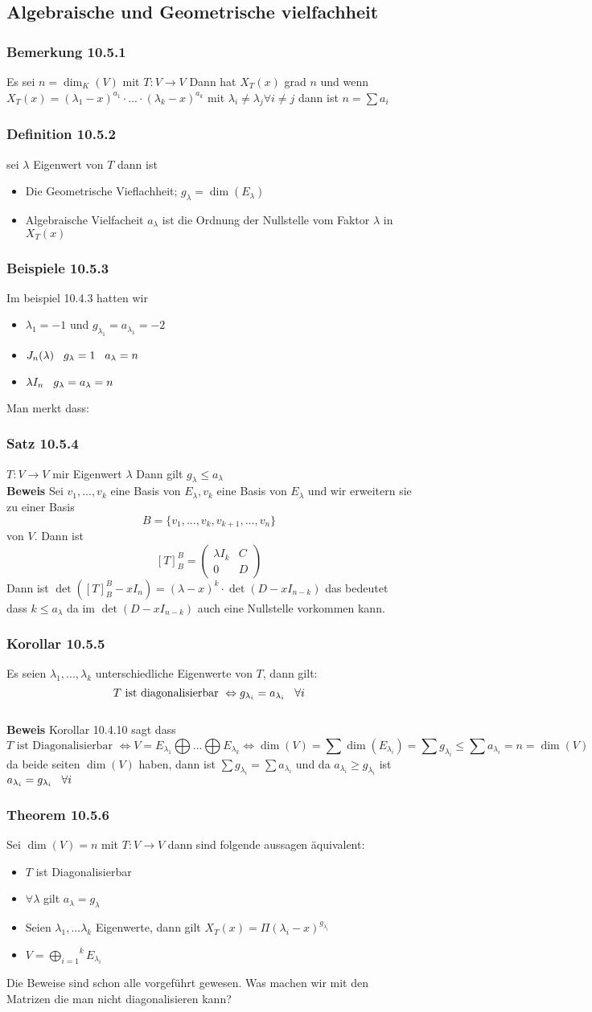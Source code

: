 \documentclass{article}
\newcommand{\smspc}{\hspace{0.3cm}}
\newcommand{\satz}[1]{\subsubsection*{Satz {#1}}}
\newcommand{\korollar}[1]{\subsubsection*{Korollar {#1}}}
\newcommand{\beweis}{\\\textbf{Beweis }}
\newcommand{\beispiel}[1]{\subsubsection*{Beispiele {#1}}}
\newcommand{\bemerkung}[1]{\subsubsection*{Bemerkung {#1}}}
\newcommand{\theorem}[1]{\subsubsection*{Theorem {#1}}}
\newcommand{\definition}[1]{\subsubsection*{Definition {#1}}}
\begin{document}
\subsection*{Algebraische und Geometrische vielfachheit}
\bemerkung{10.5.1} Es sei $n=\dim_K(V)$ mit $T:V\rightarrow V$ Dann hat $X_T(x)$ grad $n$ und wenn $X_T(x)=(\lambda_1-x)^{a_1}\cdot...\cdot (\lambda_k-x)^{a_k}$ mit $\lambda_i\neq\lambda_j\forall i\neq j$ dann ist $n=\sum a_i$
\definition{10.5.2} sei $\lambda$ Eigenwert von $T$ dann ist \begin{itemize}
  \item{Die Geometrische Vieflachheit; $g_\lambda=\dim(E_\lambda)$}
  \item{Algebraische Vielfacheit $a_\lambda$ ist die Ordnung der Nullstelle vom Faktor $\lambda$ in $X_T(x)$}
\end{itemize}
\beispiel{10.5.3} Im beispiel 10.4.3 hatten wir \begin{itemize}\item{$\lambda_1=-1$ und $g_{\lambda_1}=a_{\lambda_1}=-2$}
  \item{$J_n(\lambda)\smspc g_{\lambda}=1\smspc a_\lambda=n$}
  \item{$\lambda I_n \smspc g_\lambda=a_\lambda=n$}
\end{itemize}
Man merkt dass:

\satz{10.5.4} $T:V\rightarrow V$ mir Eigenwert $\lambda$ Dann gilt $g_\lambda\le a_\lambda$
\beweis Sei $v_1,...,v_k$ eine Basis von $E_\lambda,v_k$ eine Basis von $E_\lambda$ und wir erweitern sie zu einer Basis \[B=\lbrace v_1,...,v_k,v_{k+1},...,v_n\rbrace\]
von $V$. Dann ist \[[T]^B_B=\begin{pmatrix}\lambda I_k&C\\0&D\end{pmatrix}\] Dann ist
$\det([T]^B_B-xI_n)=(\lambda-x)^k\cdot\det(D-xI_{n-k})$ das bedeutet dass $k\le a_\lambda$ da im $\det(D-xI_{n-k})$ auch eine Nullstelle vorkommen kann.

\korollar{10.5.5} Es seien $\lambda_1,...,\lambda_k$ unterschiedliche Eigenwerte von $T$, dann gilt: \[T \text{ ist diagonalisierbar }\Leftrightarrow g_{\lambda_i}=a_{\lambda_i}\smspc \forall i\]
\beweis Korollar 10.4.10 sagt dass \[T\text{ ist Diagonalisierbar }\Leftrightarrow V=E_{\lambda_1}\bigoplus...\bigoplus E_{\lambda_k}\Leftrightarrow \dim(V)=\sum\dim(E_{\lambda_i})=\sum g_{\lambda_i}\le\sum a_{\lambda_i}=n=\dim(V)\]
da beide seiten $\dim(V)$ haben, dann ist $\sum g_{\lambda_i}=\sum a_{\lambda_i}$ und da $a_{\lambda_i}\ge g_{\lambda_i}$ ist $a_{\lambda_i}=g_{\lambda_i}\smspc\forall i$
\theorem{10.5.6} Sei $\dim(V)=n$ mit $T:V\rightarrow V$ dann sind folgende aussagen äquivalent:\begin{itemize}
  \item{$T$ ist Diagonalisierbar}
  \item{$\forall\lambda$ gilt $a_\lambda=g_\lambda$}
  \item{Seien $\lambda_1,...\lambda_k$ Eigenwerte, dann gilt $X_T(x)=\Pi(\lambda_i-x)^{g_{\lambda_i}}$}
  \item{$V=\overset{k}{\underset{i=1}{\bigoplus}}E_{\lambda_i}$}
\end{itemize}
Die Beweise sind schon alle vorgeführt gewesen.
Was machen wir mit den Matrizen die man nicht diagonalisieren kann? 
\end{document}
